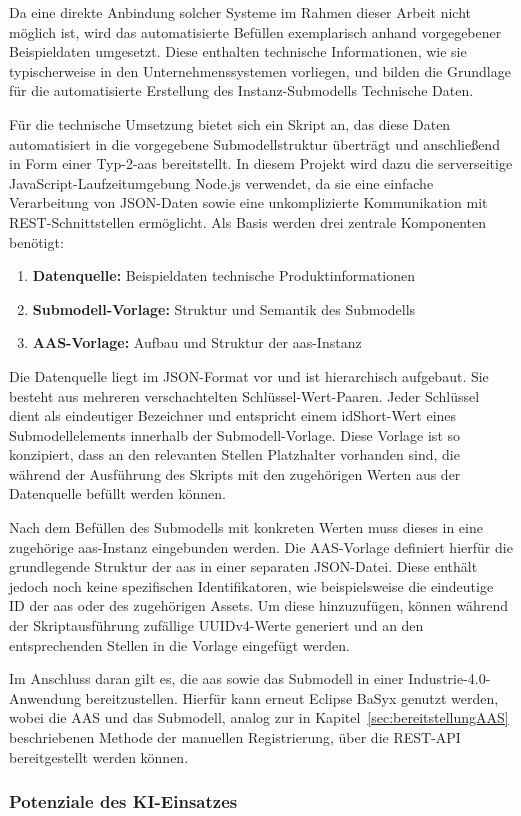 Da eine direkte Anbindung solcher Systeme im Rahmen dieser Arbeit nicht möglich ist, wird das automatisierte Befüllen exemplarisch anhand vorgegebener Beispieldaten umgesetzt.
Diese enthalten technische Informationen, wie sie typischerweise in den Unternehmenssystemen vorliegen, und bilden die Grundlage für die automatisierte Erstellung des Instanz-Submodells Technische Daten.

Für die technische Umsetzung bietet sich ein Skript an, das diese Daten automatisiert in die vorgegebene Submodellstruktur überträgt und anschließend in Form einer Typ-2-\acs{aas} bereitstellt.
In diesem Projekt wird dazu die serverseitige JavaScript-Laufzeitumgebung Node.js \cite{nodejs} verwendet, da sie eine einfache Verarbeitung von JSON-Daten sowie eine unkomplizierte Kommunikation mit REST-Schnittstellen ermöglicht. 
Als Basis werden drei zentrale Komponenten benötigt:

\begin{enumerate}[noitemsep, leftmargin=*, label=\textbf{\arabic*.}]
    \item \textbf{Datenquelle:} Beispieldaten technische Produktinformationen
    \item \textbf{Submodell-Vorlage:} Struktur und Semantik des Submodells
    \item \textbf{AAS-Vorlage:} Aufbau und Struktur der \acs{aas}-Instanz
\end{enumerate}

Die Datenquelle liegt im JSON-Format vor und ist hierarchisch aufgebaut.
Sie besteht aus mehreren verschachtelten Schlüssel-Wert-Paaren.
Jeder Schlüssel dient als eindeutiger Bezeichner und entspricht einem idShort-Wert eines Submodellelements innerhalb der Submodell-Vorlage.
Diese Vorlage ist so konzipiert, dass an den relevanten Stellen Platzhalter vorhanden sind, die während der Ausführung des Skripts mit den zugehörigen Werten aus der Datenquelle befüllt werden können.

Nach dem Befüllen des Submodells mit konkreten Werten muss dieses in eine zugehörige \acs{aas}-Instanz eingebunden werden. 
Die AAS-Vorlage definiert hierfür die grundlegende Struktur der \acs{aas} in einer separaten JSON-Datei. 
Diese enthält jedoch noch keine spezifischen Identifikatoren, wie beispielsweise die eindeutige ID der \acs{aas} oder des zugehörigen Assets. 
Um diese hinzuzufügen, können während der Skriptausführung zufällige UUIDv4-Werte generiert und an den entsprechenden Stellen in die Vorlage eingefügt werden.

Im Anschluss daran gilt es, die \acs{aas} sowie das Submodell in einer Industrie-4.0-Anwendung bereitzustellen. 
Hierfür kann erneut Eclipse BaSyx genutzt werden, wobei die AAS und das Submodell, analog zur in Kapitel~\ref{sec:bereitstellungAAS} beschriebenen Methode der manuellen Registrierung, über die REST-API bereitgestellt werden können.

\subsubsection{Potenziale des KI-Einsatzes}